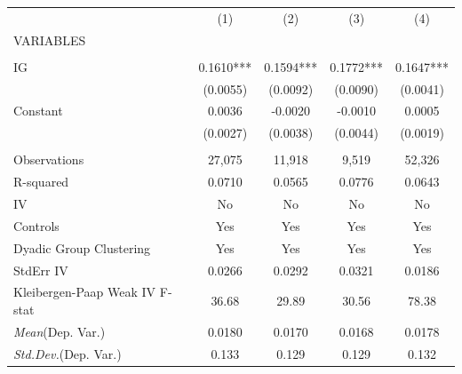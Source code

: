 \documentclass[]{article}
\begin{document}
\begin{tabular}{lcccc} \hline
 & (1) & (2) & (3) & (4) \\
VARIABLES &  &  &  &  \\ \hline
 &  &  &  &  \\
IG & 0.1610*** & 0.1594*** & 0.1772*** & 0.1647*** \\
 & (0.0055) & (0.0092) & (0.0090) & (0.0041) \\
Constant & 0.0036 & -0.0020 & -0.0010 & 0.0005 \\
 & (0.0027) & (0.0038) & (0.0044) & (0.0019) \\
 &  &  &  &  \\
Observations & 27,075 & 11,918 & 9,519 & 52,326 \\
R-squared & 0.0710 & 0.0565 & 0.0776 & 0.0643 \\
IV & No & No & No & No \\
Controls & Yes & Yes & Yes & Yes \\
Dyadic Group Clustering & Yes & Yes & Yes & Yes \\
StdErr IV & 0.0266 & 0.0292 & 0.0321 & 0.0186 \\
Kleibergen-Paap Weak IV F-stat & 36.68 & 29.89 & 30.56 & 78.38 \\
\textit{Mean}(Dep. Var.) & 0.0180 & 0.0170 & 0.0168 & 0.0178 \\
 \textit{Std.Dev.}(Dep. Var.) & 0.133 & 0.129 & 0.129 & 0.132 \\ \hline
\end{tabular}
\end{document}
